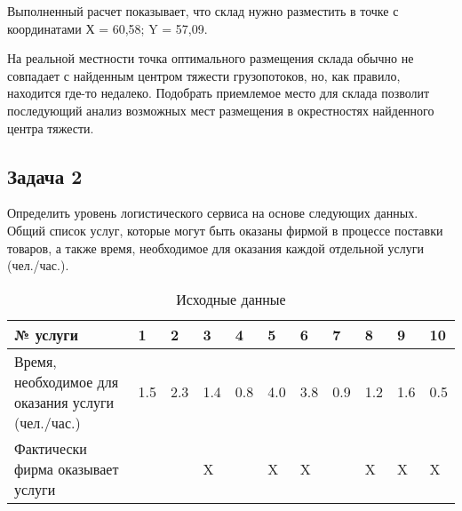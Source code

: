 Выполненный расчет показывает, что склад нужно разместить в точке с координатами Х = 60,58; Y = 57,09.

На реальной местности точка оптимального размещения склада обычно не совпадает с найденным центром тяжести грузопотоков, но, как правило, находится где-то недалеко.
Подобрать приемлемое место для склада позволит последующий анализ возможных мест размещения в окрестностях найденного центра тяжести.

\subsection{Задача 2}
Определить уровень логистического сервиса на основе следующих данных.
Общий список услуг, которые могут быть оказаны фирмой в процессе поставки товаров, а также время, необходимое для оказания каждой отдельной услуги (чел./час.).

\begin{table}[]
	\small
	\centering
	\caption{Исходные данные}
	\label{my-label}
	\setlength{\extrarowheight}{1mm}
	\begin{tabularx}{\textwidth}{|p{3cm}|K{1cm}|K{1cm}|K{1cm}|K{1cm}|K{1cm}|K{1cm}|K{1cm}|K{1cm}|K{1cm}|K{1cm}|}
		\hline
		№ услуги                                           & 1   & 2   & 3   & 4   & 5   & 6   & 7   & 8   & 9   & 10  \\ \hline
		Время, необходимое для оказания услуги (чел./час.) & 1.5 & 2.3 & 1.4 & 0.8 & 4.0 & 3.8 & 0.9 & 1.2 & 1.6 & 0.5 \\ \hline
		Фактически фирма оказывает услуги&&&X&&X&X&&X&X&X \\ \hline
	\end{tabularx}
\end{table}
